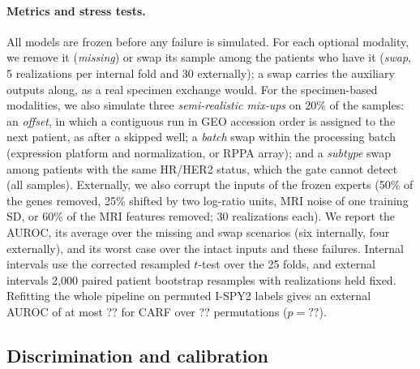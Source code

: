 \documentclass[a4paper,runningheads]{llncs}
\providecommand{\PermMaxCarf}{??}\providecommand{\NPerm}{??}\providecommand{\PermPCarf}{??}
\begin{document}
\paragraph{Metrics and stress tests.} All models are frozen before any failure is simulated. For each optional modality, we remove it (\emph{missing}) or swap its sample among the patients who have it (\emph{swap}, 5 realizations per internal fold and 30 externally); a swap carries the auxiliary outputs along, as a real specimen exchange would. For the specimen-based modalities, we also simulate three \emph{semi-realistic mix-ups} on 20\% of the samples: an \emph{offset}, in which a contiguous run in GEO accession order is assigned to the next patient, as after a skipped well; a \emph{batch} swap within the processing batch (expression platform and normalization, or RPPA array); and a \emph{subtype} swap among patients with the same HR/HER2 status, which the gate cannot detect (all samples). Externally, we also corrupt the inputs of the frozen experts (50\% of the genes removed, 25\% shifted by two log-ratio units, MRI noise of one training SD, or 60\% of the MRI features removed; 30 realizations each). We report the AUROC, its average over the missing and swap scenarios (six internally, four externally), and its worst case over the intact inputs and these failures. Internal intervals use the corrected resampled $t$-test \cite{nadeau2003} over the 25 folds, and external intervals 2{,}000 paired patient bootstrap resamples with realizations held fixed. Refitting the whole pipeline on permuted I-SPY2 labels gives an external AUROC of at most \PermMaxCarf{} for CARF over \NPerm{} permutations ($p=\PermPCarf$).

\subsection{Discrimination and calibration}

\begin{table}[t]
\centering
\caption{Discrimination on intact inputs and under modality failure. Internal: mean over 25 outer folds on I-SPY2. Fail.\ avg: mean AUROC over missing and swapped RNA, MRI, and RPPA internally (RNA and MRI externally). Worst: minimum over intact inputs and these failures; 95\% CI for CARF (paired intervals for all comparisons in the supplement). $\max|z-a|$: largest change of the logit from the clinical anchor over all external scenarios.}
\label{tab:main}
\setlength{\tabcolsep}{3pt}
\end{table}
\end{document}

